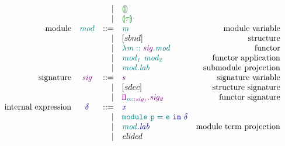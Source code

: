 \documentclass[12pt,fleqn]{article}
\newcommand{\green}[1]{\textcolor{green}{#1}}
\newcommand{\blue}[1]{\textcolor{blue}{#1}}
\newcommand{\purple}[1]{\textcolor{purple}{#1}}
\newcommand{\teal}[1]{\textcolor{teal}{#1}}
\newcommand{\greentt}[1]{\green{\mathtt{#1}}}
\newcommand{\bluett}[1]{\blue{\mathtt{#1}}}
\newcommand{\purplett}[1]{\purple{\mathtt{#1}}}
\newcommand{\tealtt}[1]{\teal{\mathtt{#1}}}
\newcommand{\greenit}[1]{\green{\mathit{#1}}}
\newcommand{\blueit}[1]{\blue{\mathit{#1}}}
\newcommand{\purpleit}[1]{\purple{\mathit{#1}}}
\newcommand{\tealit}[1]{\teal{\mathit{#1}}}
\newcommand{\typ}[1][]{\greenit{\tau#1}}
\renewcommand{\exp}[1][]{\blueit{\delta#1}}
\newcommand{\expvar}[1][]{\blueit{x#1}}
\renewcommand{\mod}[1][]{\tealit{mod#1}}
\newcommand{\modvar}[1][]{\tealit{m#1}}
\newcommand{\sig}[1][]{\purpleit{sig#1}}
\newcommand{\sigvar}[1][]{\purpleit{s#1}}
\newcommand{\lab}[1][]{\mathit{lab#1}}
\newcommand{\TypCHole}[1]{\greentt{\llparenthesis #1 \rrparenthesis}}
\newcommand{\Functor}[2]{\tealtt{\lambda #1.#2}}
\newcommand{\FunctorAp}[2]{\tealtt{#1~#2}}
\newcommand{\SubModulePrj}[2]{\tealtt{#1.#2}}
\newcommand{\ModleTermPrj}[2]{\bluett{#1.#2}}
\newcommand{\LetModle}[2]{\tealtt{module~#1=#2}\bluett{~in~\exp}}
\newcommand{\FunctorSig}[2]{\purplett{\Pi_{#1}.{#2}}}
\begin{document}
\[\begin{array}{rcrlr}
                           && \vert & \TypCHole{} \\
                           && \vert & \TypCHole{\typ} \\
    \textrm{module} & \mod & ::=
                    & \modvar & \textrm{module variable} \\
                    && \vert & [sbnd] & \textrm{structure} \\
                    && \vert & \Functor{\modvar::\sig}{\mod} & \textrm{functor} \\
                    && \vert & \FunctorAp{\mod[_1]}{\mod[_2]} & \textrm{functor application} \\
                    && \vert & \SubModulePrj{\mod}{\lab} & \textrm{submodule projection} \\
    \textrm{signature} & \sig & ::=
                       & \sigvar & \textrm{signature variable} \\
                       && \vert & [sdec] & \textrm{structure signature} \\
                       && \vert & \FunctorSig{\modvar::\sig[_1]}{\sig[_2]} & \textrm{functor signature} \\
    \textrm{internal expression} & \exp & ::=
                                 & \expvar \\
                                 && \vert & \LetModle{p}{e} \\
                                 && \vert & \ModleTermPrj{\mod}{\lab} & \textrm{module term projection} \\
                                 && \vert & \textit{elided} \\
\end{array}\]
\end{document}
